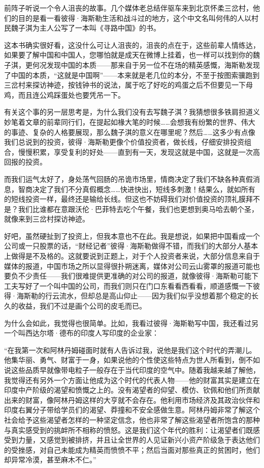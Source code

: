 前阵子听说一个令人沮丧的故事。几个媒体老总结伴驱车来到北京怀柔三岔村，他们的目的是看一看彼得·海斯勒生活和战斗过的地方，这个中文名叫何伟的人以村民魏子淇为主人公写了一本叫《寻路中国》的书。

这本书确实很好看，这没什么可让人沮丧的，沮丧的点在于，这些前辈人情练达，如果要了解中国和中国人，您哪怕就是成天在微博上挂着，也一样可以找到你的魏子淇，更何况发现中国的本质------那来自于另一位不在场的精英感慨，海斯勒发现了中国的本质，``这就是中国啊''------本来就是老几位的本分，不至于按图索骥跑到三岔村来探访神迹，按钱钟书的说法，属于吃了好吃的鸡蛋之后不但要见一下母鸡，而且连公鸡踩蛋处也要凭吊一下。

有关这个事的另一层思考是，为什么我们没有去写魏子淇？我猜想很多铁肩担道义妙笔着文章的前辈同行们，在提起如椽大笔的时候\ldots{}\ldots{}会想我有纷繁的世界、伟大的事迹、复杂的人格要展现，那么魏子淇的意义在哪里呢？然后\ldots{}\ldots{}这多少有点像我们总说到的投资，彼得·海斯勒更像个价值投资者，做长线，仔细安排投资组合，慢慢积累，享受复利的好处------直到有一天，发现这就是中国，这就是一次高回报的投资。

而我们运气太好了，身处荡气回肠的吊诡市场里，情商决定了我们不缺各种真假消息，智商决定了我们不分真假概念\ldots{}\ldots{}快进快出，短线多刺激！结果么，就如所有的短线投资一样，最终还是输给长线。但这也不妨碍我们对价值投资的顶礼膜拜不是？我们比谁都在意跟沃伦·巴菲特去吃个午餐，我们也更想到奥马哈去朝个圣，就像来到三岔村探访神迹。

好吧，虽然硬扯到了投资上，但我本意也不在此。我是想说，如果把中国看成一个公司或一只股票的话，``财经记者''彼得·海斯勒做得不错，而我们的大部分人基本上做得是不及格的。这就要说到正题上，对于个人投资者来说，大部分信息来自于媒体的报道，中国市场之所以显得很扑朔迷离，媒体对公司云山雾罩的报道可能也要负不少责任------我们很难提供更准确的对公司的报道，就像彼得·海斯勒可能下工夫写好了一个叫中国的公司，而我们则只在门口东看看西看看，顺道感慨一下彼得·海斯勒的行云流水，但却总是高山仰止------因为我们似乎没想着那个稳定的长久的收益，我们不过是画个公司的皮毛而已。

为什么会如此，我觉得也很简单。比如，我看过彼得·海斯勒写中国，我还看过另一个叫西达尔塔·德布的印度人写印度的企业家：

``在我第一次和阿林丹姆碰面时就有人告诉过我，说他是我们这个时代的弄潮儿。他集华丽、勇气、财富于一身，如果说他的个性使这些特点为世人所看到，倒不如说这些品质早就像带电粒子一般存在于当代印度的空气中。随着我越来越了解他，我觉得还有另外一个方面让他成为这个时代的代表人物------他的财富其实是建立在印度中产阶级的渴望和愤慨之上的。没有渴望者的仰望、模仿、钦佩和他们所贡献出来的财富，像阿林丹姆这样的大亨就不会存在。他利用市场经济及其政治伙伴和印度右翼分子带给学员们的渴望、莽撞和不安全感做生意。阿林丹姆非常了解这个社会给予这些渴望者怎样的一种坚定信念，他也非常了解这些渴望者所饱含的那种与真实感受到的挑衅所不相称的愤怒。这是我们这个年代的胜利：让渴望者们既感受到力量，又感觉到被排挤，并且让全世界的人见证新兴小资产阶级急于表达他们的受挫感，对自己未能成为精英而愤愤不平；然后当面对那些真正的贫困时，他们却异常冷漠，甚至麻木不仁。''

